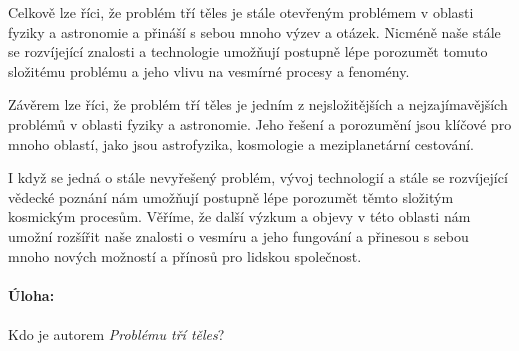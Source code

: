 \documentclass{../../../../style/mkimain}
\begin{document}
Celkově lze říci, že problém tří těles je stále otevřeným problémem v oblasti fyziky a astronomie a přináší s sebou mnoho výzev a otázek. Nicméně naše stále se rozvíjející znalosti a technologie umožňují postupně lépe porozumět tomuto složitému problému a jeho vlivu na vesmírné procesy a fenomény.

Závěrem lze říci, že problém tří těles je jedním z nejsložitějších a nejzajímavějších problémů v oblasti fyziky a astronomie. Jeho řešení a porozumění jsou klíčové pro mnoho oblastí, jako jsou astrofyzika, kosmologie a meziplanetární cestování.

I když se jedná o stále nevyřešený problém, vývoj technologií a stále se rozvíjející vědecké poznání nám umožňují postupně lépe porozumět těmto složitým kosmickým procesům. Věříme, že další výzkum a objevy v této oblasti nám umožní rozšířit naše znalosti o vesmíru a jeho fungování a přinesou s sebou mnoho nových možností a přínosů pro lidskou společnost.
\\
\\
\textbf{Úloha:}
\\
\\
Kdo je autorem \emph{Problému tří těles}?
\end{document}
